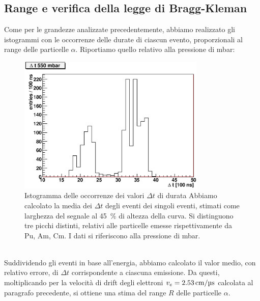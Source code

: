 \documentclass[italian,a4paper]{article}
\renewcommand{\a}{\alpha}
\newcommand{\D}{\Delta}
\begin{document}
\subsection{Range e verifica della legge di Bragg-Kleman}
Come per le grandezze analizzate precedentemente, abbiamo realizzato gli istogrammi con le occorrenze delle durate di ciascun evento, proporzionali al range delle particelle $\a$.
Riportiamo quello relativo alla pressione di \unit[550]{mbar}:
\begin{figure}[h!]\centering
\includegraphics[width=0.8\textwidth]{550_range.eps}
\caption{Istogramma delle occorrenze dei valori $\D t$ di durata Abbiamo calcolato la media dei $\D t$ degli eventi dei singoli eventi, stimati come larghezza del segnale al 45~\% di altezza della curva. Si distinguono tre picchi distinti, relativi alle particelle emesse rispettivamente da Pu, Am, Cm. I dati si riferiscono alla pressione di \unit[550]{mbar}.}
\label{range_hist}
\end{figure}\\
Suddividendo gli eventi in base all'energia, abbiamo calcolato il valor medio, con relativo errore, di $\D t$ corrispondente a ciascuna emissione. Da questi, moltiplicando per la velocit\`a di drift degli elettroni $v_e = \unit[2.53]{cm/\micro s}$ calcolata al paragrafo precedente, si ottiene una stima del range $R$ delle particelle $\a$.
\end{document}
